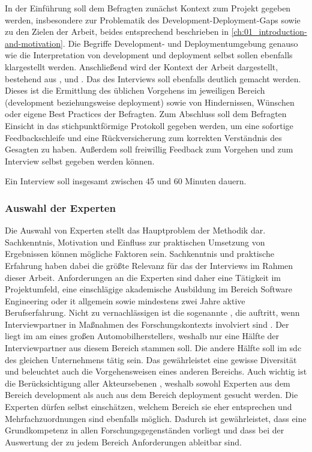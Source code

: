 In der Einführung soll dem Befragten zunächst Kontext zum Projekt gegeben werden, insbesondere zur Problematik des Development-Deployment-Gaps sowie zu den Zielen der Arbeit, beides entsprechend beschrieben in \autoref{ch:01_introduction-and-motivation}. Die Begriffe Development- und Deploymentumgebung genauso wie die Interpretation von \Gls{development} und \Gls{deployment} selbst sollen ebenfalls klargestellt werden. Anschließend wird der Kontext der Arbeit dargestellt, bestehend aus ,  und . Das  des Interviews soll ebenfalls deutlich gemacht werden. Dieses ist die Ermittlung des üblichen Vorgehens im jeweiligen Bereich (\Gls{development} beziehungsweise \Gls{deployment}) sowie von Hindernissen, Wünschen oder eigene Best Practices der Befragten. Zum Abschluss soll dem Befragten Einsicht in das stichpunktförmige Protokoll gegeben werden, um eine sofortige Feedbackschleife und eine Rückversicherung zum korrekten Verständnis des Gesagten zu haben. Außerdem soll freiwillig Feedback zum Vorgehen und zum Interview selbst gegeben werden können.

Ein Interview soll insgesamt zwischen 45 und 60 Minuten dauern.

\subsubsection{Auswahl der Experten}
\label{subsubsec:04-01-02-03_selection-of-experts}

Die Auswahl von Experten stellt das Hauptproblem der Methodik dar. Sachkenntnis, Motivation und Einfluss zur praktischen Umsetzung von Ergebnissen können mögliche Faktoren sein. \cite{401:Das-Experteninterview} Sachkenntnis und praktische Erfahrung haben dabei die größte Relevanz für das  der Interviews im Rahmen dieser Arbeit. Anforderungen an die Experten sind daher eine Tätigkeit im Projektumfeld, eine einschlägige akademische Ausbildung im Bereich Software Engineering oder \Gls{it} allgemein sowie mindestens zwei Jahre aktive Berufserfahrung. Nicht zu vernachlässigen ist die sogenannte , die auftritt, wenn Interviewpartner in Maßnahmen des Forschungskontexts involviert sind \cite{401:Das-Experteninterview}. Der  liegt im \Gls{am} eines großen Automobilherstellers, weshalb nur eine Hälfte der Interviewpartner aus diesem Bereich stammen soll. Die andere Hälfte soll im \Gls{sdc} des gleichen Unternehmens tätig sein. Das gewährleistet eine gewisse Diversität und beleuchtet auch die Vorgehensweisen eines anderen Bereichs. Auch wichtig ist die Berücksichtigung aller Akteursebenen \cite{401:Das-Experteninterview}, weshalb sowohl Experten aus dem Bereich \Gls{development} als auch aus dem Bereich \Gls{deployment} gesucht werden. Die Experten dürfen selbst einschätzen, welchem Bereich sie eher entsprechen und Mehrfachzuordnungen sind ebenfalls möglich. Dadurch ist gewährleistet, dass eine Grundkompetenz in allen Forschungsgegenständen vorliegt und dass bei der Auswertung der  zu jedem Bereich Anforderungen ableitbar sind.

